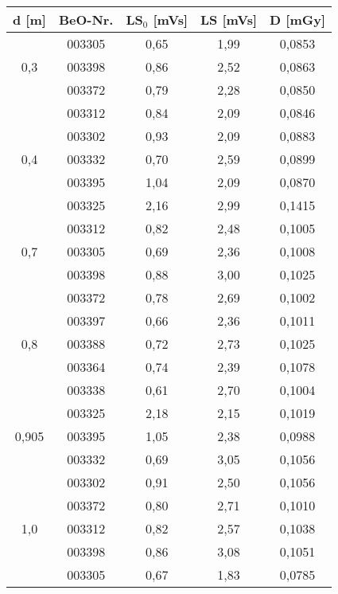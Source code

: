 \vspace{5mm}
\minipanf
	\begin{center}	
		\begin{tabular}{c|c|c|c|c}
			\textbf{d} [m] & BeO-Nr. & \textbf{LS$_0$} [mVs] & \textbf{LS} [mVs] & \textbf{D} [mGy] \\
			\hline  
								& 003305 & 0,65 & 1,99 & 0,0853\\
						0,3		& 003398 & 0,86 & 2,52 & 0,0863\\
								& 003372 & 0,79 & 2,28 & 0,0850\\
								& 003312 & 0,84 & 2,09 & 0,0846\\
			\hline  
								& 003302 & 0,93 & 2,09 & 0,0883\\
						0,4		& 003332 & 0,70 & 2,59 & 0,0899\\
								& 003395 & 1,04 & 2,09 & 0,0870\\
								& 003325 & 2,16 & 2,99 & 0,1415\\
			\hline  
								& 003312 & 0,82 & 2,48 & 0,1005\\
						0,7		& 003305 & 0,69 & 2,36 & 0,1008\\
								& 003398 & 0,88 & 3,00 & 0,1025\\
								& 003372 & 0,78 & 2,69 & 0,1002\\
			\hline  
								& 003397 & 0,66 & 2,36 & 0,1011\\
						0,8		& 003388 & 0,72 & 2,73 & 0,1025\\
								& 003364 & 0,74 & 2,39 & 0,1078\\
								& 003338 & 0,61 & 2,70 & 0,1004\\
			\hline  
								& 003325 & 2,18 & 2,15 & 0,1019\\
						0,905   	& 003395 & 1,05 & 2,38 & 0,0988\\
								& 003332 & 0,69 & 3,05 & 0,1056\\
								& 003302 & 0,91 & 2,50 & 0,1056\\
			\hline  
								& 003372 & 0,80 & 2,71 & 0,1010\\
						1,0		& 003312 & 0,82 & 2,57 & 0,1038\\
								& 003398 & 0,86 & 3,08 & 0,1051\\
								& 003305 & 0,67 & 1,83 & 0,0785\\
								
		\end{tabular}
        \label{dft:osl}
	\end{center}
\minipend
\vspace{5mm}

